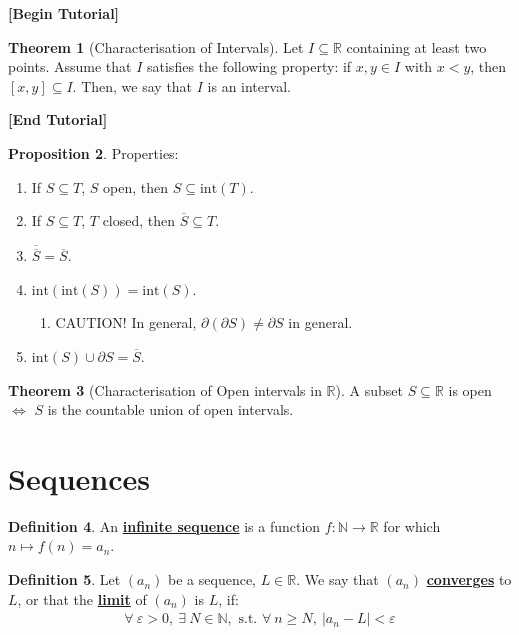\documentclass[reqno,11pt]{amsart}
\theoremstyle{definition}
\newtheorem{theorem}{Theorem}
\newtheorem{prop}[theorem]{Proposition}
\theoremstyle{definition}
\newtheorem{definition}[theorem]{Definition}
\theoremstyle{remark}
\newcommand{\R}{\mathbb{R}}
\newcommand{\N}{\mathbb{N}}
\newcommand{\eps}{\varepsilon}
\newcommand{\dfn}[1]{\underline{\textbf{#1}}}
\begin{document}
\begin{center}
	\textbf{[Begin Tutorial]}
\end{center}
\begin{theorem}[Characterisation of Intervals]
	Let $I \subseteq \R$ containing at least two points. Assume that $I$ satisfies the following property: if $x, y \in I$ with $x < y$, then $[x,y] \subseteq I$. Then, we say that $I$ is an interval.
\end{theorem}

\begin{center}
	\textbf{[End Tutorial]}
\end{center}

\begin{prop}
	Properties: 
	\begin{enumerate}[noitemsep]
		\item If $S \subseteq T$, $S$ open, then $S \subseteq \mathrm{int}(T)$.
		\item If $S \subseteq T$, $T$ closed, then $\overline{S} \subseteq T$.
		\item $\overline{\overline{S}} = \overline{S}$.
		\item $\mathrm{int}(\mathrm{int}(S)) = \mathrm{int}(S)$.
		\begin{enumerate}[noitemsep]
			\item CAUTION! In general, $\partial (\partial S) \neq \partial S$ in general.
		\end{enumerate}
	\item $\mathrm{int}(S) \cup \partial S = \overline{S}$.
	\end{enumerate}
\end{prop}

\begin{theorem}[Characterisation of Open intervals in $\R$]
	A subset $S \subseteq \R$ is open $\iff$ $S$ is the countable union of open intervals.
\end{theorem}


\section{Sequences}

\begin{definition}
	An \dfn{infinite sequence} is a function $f: \N \rightarrow \R$ for which $n \mapsto f(n) = a_n$.
\end{definition}

\begin{definition}
	Let $(a_n)$ be a sequence, $L \in \R$. We say that $(a_n)$ \dfn{converges} to $L$, or that the \dfn{limit} of $(a_n)$ is $L$, if:
	\begin{align}
		\forall\ \eps > 0,\ \exists\ N \in \N, \text{ s.t. } \forall\ n \geq N,\ |a_n - L| < \eps 	
	\end{align}
\end{definition}
\end{document}
